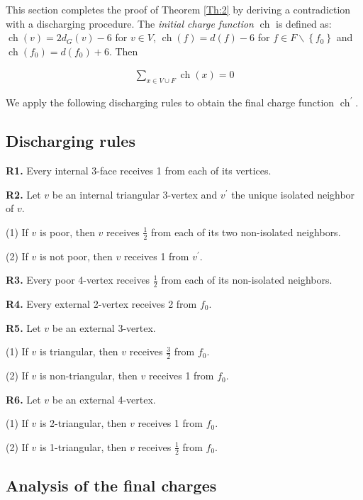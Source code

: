 \documentclass{article}
\begin{document}
This section completes the proof of Theorem \ref{Th:2} by deriving a contradiction with a discharging procedure. The \textit{initial charge function} $\operatorname{ch}$ is defined as:  $\operatorname{ch}(v)=2 d_G(v)-6$ for $v \in V$, $\operatorname{ch}(f)=d(f)-6$ for $f \in F \backslash \left\{f_{0} \right\}$ and  $\operatorname{ch}(f_{0})=d\left(f_{0}\right)+6$. Then 

\begin{gather*}
    \sum_{x \in V \cup F} \operatorname{ch}(x)=0
\end{gather*}

We apply the following discharging rules to obtain the final charge function  $\operatorname{ch}^{\prime}$. 


\subsection{Discharging rules}
\textbf{R1.} Every internal 3-face receives 1 from each of its vertices.
\par
\textbf{R2.} Let $v$ be an internal triangular 3-vertex and $v^{\prime}$ the unique isolated neighbor of $v$.
\par
\quad \quad(1) If $ v $ is poor, then $ v $ receives $ \frac{1}{2} $ from each of its two non-isolated neighbors.
\par
\quad \quad(2) If $ v $ is not poor, then $ v $ receives 1 from $ v^{\prime} $.
\par
\textbf{R3.} Every poor 4-vertex receives $ \frac{1}{2} $ from each of its non-isolated neighbors.
\par
\textbf{R4.} Every external 2-vertex receives 2 from $ f_{0} $.
\par
\textbf{R5.} Let $ v $ be an external 3-vertex.
\par
\quad \quad(1) If $ v $ is triangular, then $ v $ receives $ \frac{3}{2} $ from $ f_{0} $.
\par
\quad \quad(2) If $ v $ is non-triangular, then $ v $ receives 1 from $ f_{0} $.
\par
\textbf{R6.} Let $ v $ be an external 4-vertex.
\par
\quad \quad(1) If $ v $ is 2-triangular, then $ v $ receives 1 from $ f_{0} $.
\par
\quad \quad(2) If $ v $ is 1-triangular, then $ v $ receives $ \frac{1}{2}$ from $f_{0}$.

\subsection{Analysis of the final charges}
\end{document}
